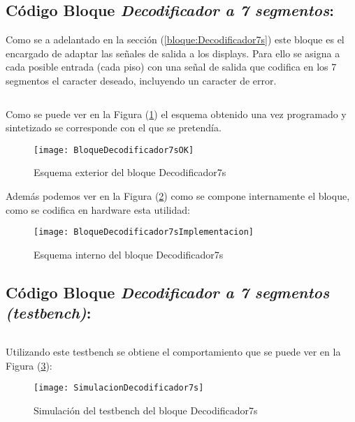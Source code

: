 \subsection{Código Bloque \textit{Decodificador a 7 segmentos}:} \label{code:Decodificador7s}
	Como se a adelantado en la sección (\ref{bloque:Decodificador7s}) este bloque es el encargado de adaptar las señales de salida a los displays. Para ello se asigna a cada posible entrada (cada piso) con una señal de salida que codifica en los 7 segmentos el caracter deseado, incluyendo un caracter de error.

	\inputminted[frame=lines,fontsize=\footnotesize,linenos]{vhdl}{CodeFiles/Decodificador7s.vhd}
	
	Como se puede ver en la Figura (\ref{fig:BloqueDecodificador7sOK}) el esquema obtenido una vez programado y sintetizado se corresponde con el que se pretendía.
    \begin{figure}[H]
		    \centering
		    \texttt{[image: BloqueDecodificador7sOK]}
		    \caption{Esquema exterior del bloque Decodificador7s}
		    \label{fig:BloqueDecodificador7sOK}
	\end{figure}
    Además podemos ver en la Figura (\ref{fig:BloqueDecodificador7sImplementacion}) como se compone internamente el bloque, como se codifica en hardware esta utilidad:
    \begin{figure}[H]
		    \centering
		    \texttt{[image: BloqueDecodificador7sImplementacion]}
		    \caption{Esquema interno del bloque Decodificador7s}
		    \label{fig:BloqueDecodificador7sImplementacion}
	\end{figure}

\subsection{Código Bloque \textit{Decodificador a 7 segmentos (testbench)}:} \label{code:Decodificador7s_tb}
	
	\inputminted[frame=lines,fontsize=\footnotesize,linenos]{vhdl}{CodeFiles/Decodificador7s_tb.vhd}
	
	Utilizando este testbench se obtiene el comportamiento que se puede ver en la Figura (\ref{fig:SimulacionDecodificador7s}):

    \begin{figure}[H]
		    \centering
		    \texttt{[image: SimulacionDecodificador7s]}
		    \caption{Simulación del testbench del bloque Decodificador7s}
		    \label{fig:SimulacionDecodificador7s}
	\end{figure}

